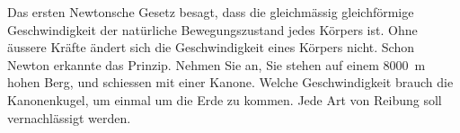 
\begin{aufgabe}
	Das ersten Newtonsche Gesetz besagt, dass die gleichmässig gleichförmige Geschwindigkeit der natürliche Bewegungszustand
	jedes Körpers ist. Ohne äussere Kräfte ändert sich die Geschwindigkeit eines Körpers nicht.
	Schon Newton erkannte das Prinzip. Nehmen Sie an, Sie stehen auf einem \SI{8000}{m} hohen Berg, und schiessen mit
	einer Kanone. Welche Geschwindigkeit brauch die Kanonenkugel, um einmal um die Erde zu kommen.
	Jede Art von Reibung soll vernachlässigt werden.
\end{aufgabe}
\begin{center}
\end{center}
